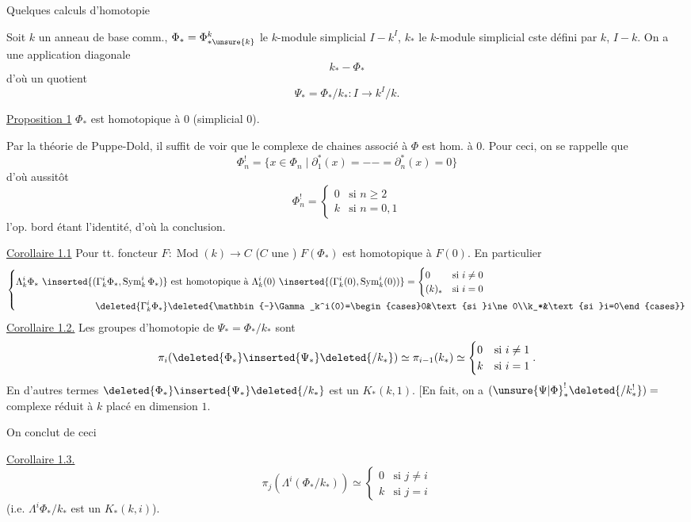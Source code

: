 Quelques calculs d'homotopie

Soit $k$ un anneau de base comm.,
$\Phi_*=\Phi^k_{*\unsure{k}}$ le $k$-module simplicial $I\mathbin{-}k^I$,
$k_*$ le $k$-module simplicial cste défini par $k$, $I\mathbin{-}k$.
On a une application diagonale
\[k_*\mathbin{-}\Phi_*\]
d'où un quotient
\[\Psi_*=\Phi_*/k_*:I\longrightarrow k^I/k.\]

\uline{Proposition 1} $\Phi_*$ est homotopique à $0$ 
(simplicial $0$).

Par la théorie de Puppe-Dold, il suffit de voir que le complexe de chaines
\inserted{$\Phi_*^!$} associé \deleted{$\unsure{\Phi}$} à $\Phi$ est hom. à $0$.
Pour ceci, on se rappelle que
\[
\Phi_n^!=\{x\in\Phi_n\mid\partial_1^*(x)=- -=\partial_n^*(x)=0\}
\]
d'où aussitôt
\[
\Phi_n^!=\begin{cases}0&\text{si }n\geq2\\k&\text{si }n=0,1\end{cases}
\]
l'op.  bord
étant l'identité, d'où la conclusion.

\uline{Corollaire 1.1} Pour tt. foncteur $F:\operatorname{Mod}(k)\longrightarrow C$
($C$ une ) $F(\Phi_*)$ est homotopique à $F(0)$.
En particulier
\[
\left\{\begin{aligned}
\Lambda_k^i\Phi_*\ \inserted{(\Gamma_k^i\Phi_*,\operatorname{Sym}_k^i\Phi_*)}
&\text{ est homotopique à }\Lambda_k^i(0)\ \inserted{(\Gamma_k^i(0),\operatorname{Sym}_k^i(0))}
=\begin{cases}0&\text{si }i\ne0\\(k)_*&\text{si }i=0\end{cases}\\
\deleted{\Gamma_k^i\Phi_*}&\deleted{\mathbin{-}\Gamma_k^i(0)=\begin{cases}0&\text{si }i\ne0\\k_*&\text{si }i=0\end{cases}}
\end{aligned}\right.
\]
\uline{Corollaire 1.2.} Les groupes d'homotopie de $\Psi_*=\Phi_*/k_*$ sont
\[
\pi_i(\deleted{\Phi_*}\inserted{\Psi_*}\deleted{/k_*})
\simeq\pi_{i-1}(k_*)\simeq\begin{cases}0&\text{si }i\ne1\\k&\text{si }i=1\end{cases}.
\]
En d'autres termes $\deleted{\Phi_*}\inserted{\Psi_*}\deleted{/k_*}$ est un $K_*(k,1)$.
[En fait, on a $(\unsure{\Psi|\Phi}_*^!\deleted{/k_*^!})=$ complexe réduit à $k$ placé en dimension $1$.

On conclut de ceci 

\uline{Corollaire 1.3.}
\[
\pi_j(\Lambda^i(\Phi_*/k_*))\simeq
\begin{cases}0&\text{si }j\ne i\\k&\text{si }j=i\end{cases}
\]
(i.e. $\Lambda^i\Phi_*/k_*$ est un $K_*(k,i)$).
